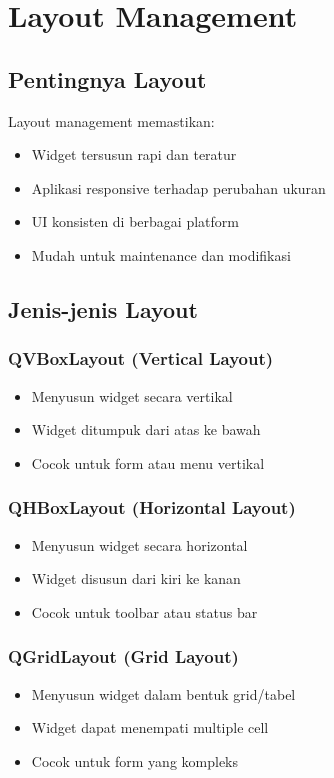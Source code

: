 \section{Layout Management}

\subsection{Pentingnya Layout}

Layout management memastikan:
\begin{itemize}
\item Widget tersusun rapi dan teratur
\item Aplikasi responsive terhadap perubahan ukuran
\item UI konsisten di berbagai platform
\item Mudah untuk maintenance dan modifikasi
\end{itemize}

\subsection{Jenis-jenis Layout}

\subsubsection{QVBoxLayout (Vertical Layout)}
\begin{itemize}
\item Menyusun widget secara vertikal
\item Widget ditumpuk dari atas ke bawah
\item Cocok untuk form atau menu vertikal
\end{itemize}

\subsubsection{QHBoxLayout (Horizontal Layout)}
\begin{itemize}
\item Menyusun widget secara horizontal
\item Widget disusun dari kiri ke kanan
\item Cocok untuk toolbar atau status bar
\end{itemize}

\subsubsection{QGridLayout (Grid Layout)}
\begin{itemize}
\item Menyusun widget dalam bentuk grid/tabel
\item Widget dapat menempati multiple cell
\item Cocok untuk form yang kompleks
\end{itemize}

